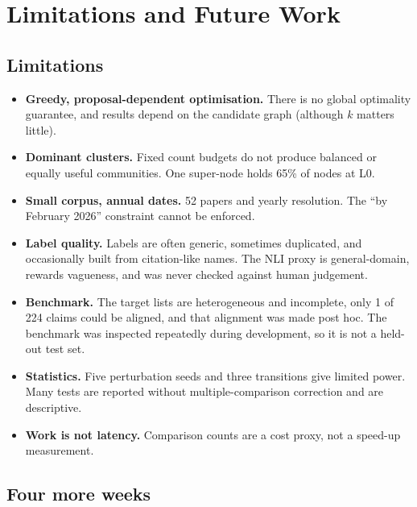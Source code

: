 \documentclass[11pt,a4paper]{article}
\theoremstyle{remark}
\begin{document}
\section{Limitations and Future Work}
\label{sec:limitations}

\subsection{Limitations}

\begin{itemize}
  \item \textbf{Greedy, proposal-dependent optimisation.} There is no global optimality
        guarantee, and results depend on the candidate graph (although $k$ matters little).
  \item \textbf{Dominant clusters.} Fixed count budgets do not produce balanced or equally
        useful communities. One super-node holds 65\% of nodes at L0.
  \item \textbf{Small corpus, annual dates.} 52 papers and yearly resolution. The ``by February
        2026'' constraint cannot be enforced.
  \item \textbf{Label quality.} Labels are often generic, sometimes duplicated, and occasionally
        built from citation-like names. The NLI proxy is general-domain, rewards vagueness, and
        was never checked against human judgement.
  \item \textbf{Benchmark.} The target lists are heterogeneous and incomplete, only 1 of 224
        claims could be aligned, and that alignment was made post hoc. The benchmark was
        inspected repeatedly during development, so it is not a held-out test set.
  \item \textbf{Statistics.} Five perturbation seeds and three transitions give limited power.
        Many tests are reported without multiple-comparison correction and are descriptive.
  \item \textbf{Work is not latency.} Comparison counts are a cost proxy, not a speed-up
        measurement.
\end{itemize}

\subsection{Four more weeks}
\end{document}
